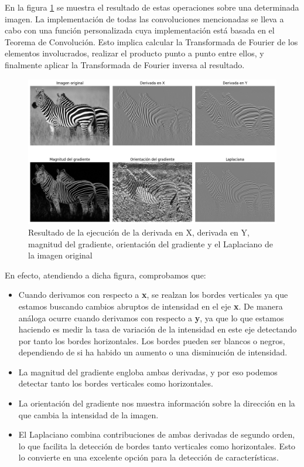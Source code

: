 \begin{observacion}
    En la figura \ref{fig:enter-label} se muestra el resultado de estas operaciones sobre una determinada imagen. La implementación de todas las convoluciones mencionadas se lleva a cabo con una función personalizada cuya implementación está basada en el Teorema de Convolución. Esto implica calcular la Transformada de Fourier de los elementos involucrados, realizar el producto punto a punto entre ellos, y finalmente aplicar la Transformada de Fourier inversa al resultado.
\end{observacion}
\begin{figure}[h]
    \centering
    \includegraphics[width=1.0\textwidth, height=0.65\textwidth]{img/sin_titulo2.png}
    \caption{Resultado de la ejecución de la derivada en X, derivada en Y, magnitud del gradiente, orientación del gradiente y el Laplaciano de la imagen original}
    \label{fig:enter-label}
\end{figure}



 \noindent En efecto, atendiendo a dicha figura, comprobamos que:
\begin{itemize}
    \item Cuando derivamos con respecto a \textbf{x}, se realzan los bordes verticales ya que estamos buscando cambios abruptos de intensidad en el eje \textbf{x}. De manera análoga ocurre cuando derivamos con respecto a \textbf{y}, ya que lo que estamos haciendo es medir la tasa de variación de la intensidad en este eje detectando por tanto los bordes horizontales. Los bordes pueden ser blancos o negros, dependiendo de si ha habido un aumento o una disminución de intensidad.
    \item La magnitud del gradiente engloba ambas derivadas, y por eso podemos detectar tanto los bordes verticales como horizontales.
    \item La orientación del gradiente nos muestra información sobre la dirección en la que cambia la intensidad de la imagen.
    \item  El Laplaciano  combina contribuciones de ambas derivadas de segundo orden, lo que facilita la detección de bordes tanto verticales como horizontales. Esto lo convierte en una excelente opción para la detección de características.
\end{itemize}


